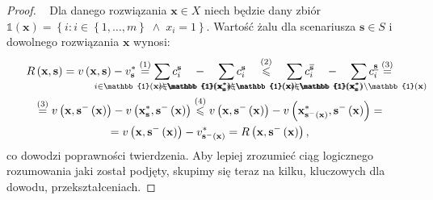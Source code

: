 \begin{proof}~\cite[$431$]{minmaxSurvey}
	Dla danego rozwiązania $ \textbf{x} \in X$ niech będzie dany zbiór $\mathbb{1} \left( \textbf{x} \right) = \left\{ i : i \in \left\{ 1, \dots, m \right\} \; \wedge \; x_{i} = 1 \right\}$. Wartość żalu dla scenariusza $\textbf{s} \in S$ i dowolnego rozwiązania $\textbf{x}$ wynosi:
	\begin{gather*}
		R \left( \textbf{x}, \textbf{s} \right) = v \left( \textbf{x}, \textbf{s} \right) - v^{\ast}_{\textbf{s}} \overset{\left( 1 \right)}{=} \sum_{\mathclap{i \in \mathbb{1} \left( \textbf{x} \right) \setminus \mathbb{1} \left( \textbf{x}^{\ast}_{\textbf{s}} \right)}} c_{i}^{\textbf{s}} \quad - \quad \sum_{\mathclap{i \in \mathbb{1} \left( \textbf{x}^{\ast}_{\textbf{s}} \right) \setminus \mathbb{1} \left( \textbf{x} \right)}} c_{i}^{\textbf{s}} \quad \overset{\left( 2 \right)}{\leqslant} \quad \sum_{\mathclap{i \in \mathbb{1} \left( \textbf{x} \right) \setminus \mathbb{1} \left( \textbf{x}^{\ast}_{\textbf{s}} \right)}} c^{\overline{\textbf{s}}}_{i} \quad - \quad \sum_{\mathclap{i \in \mathbb{1} \left( \textbf{x}^{\ast}_{\textbf{s}} \right) \setminus \mathbb{1} \left( \textbf{x} \right)}} c^{\underline{\textbf{s}}}_{i} \overset{\left( 3 \right)}{=} \\ \overset{\left( 3 \right)}{=} v \left( \textbf{x}, \textbf{s}^{-} \left( \textbf{x} \right) \right) - v \left( \textbf{x}^{\ast}_{\textbf{s}}, \textbf{s}^{-} \left( \textbf{x} \right) \right) \overset{\left( 4 \right)}{\leqslant} v \left( \textbf{x}, \textbf{s}^{-} \left( \textbf{x} \right) \right) - v \left( \textbf{x}^{\ast}_{\textbf{s}^{-} \left( \textbf{x} \right)}, \textbf{s}^{-} \left( \textbf{x} \right) \right) = \\ = v \left( \textbf{x}, \textbf{s}^{-} \left( \textbf{x} \right) \right) - v^{\ast}_{\textbf{s}^{-} \left( \textbf{x} \right)} = R \left( \textbf{x}, \textbf{s}^{-} \left( \textbf{x} \right) \right)\text{,}
	\end{gather*}
	co dowodzi poprawności twierdzenia. Aby lepiej zrozumieć ciąg logicznego rozumowania jaki został podjęty, skupimy się teraz na kilku, kluczowych dla dowodu, przekształceniach.
	

\end{proof}
